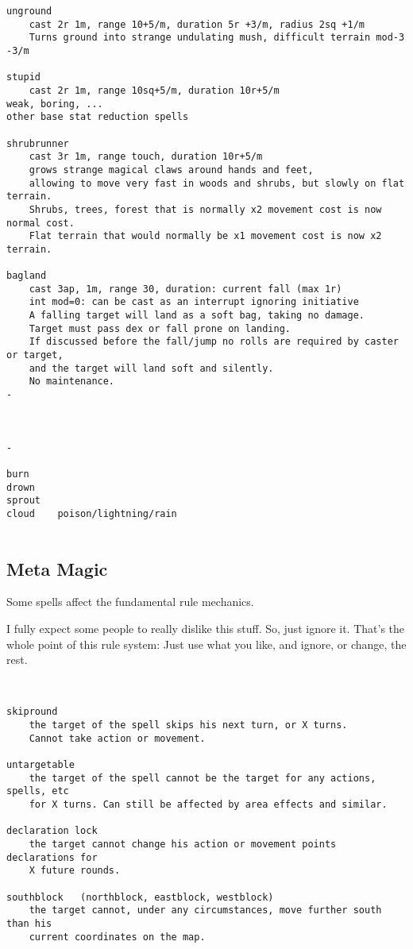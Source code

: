 \begin{verbatim}
unground
    cast 2r 1m, range 10+5/m, duration 5r +3/m, radius 2sq +1/m
    Turns ground into strange undulating mush, difficult terrain mod-3 -3/m

stupid
    cast 2r 1m, range 10sq+5/m, duration 10r+5/m
weak, boring, ...
other base stat reduction spells

shrubrunner
    cast 3r 1m, range touch, duration 10r+5/m
    grows strange magical claws around hands and feet, 
    allowing to move very fast in woods and shrubs, but slowly on flat terrain.
    Shrubs, trees, forest that is normally x2 movement cost is now normal cost.
    Flat terrain that would normally be x1 movement cost is now x2 terrain.

bagland
    cast 3ap, 1m, range 30, duration: current fall (max 1r)
    int mod=0: can be cast as an interrupt ignoring initiative
    A falling target will land as a soft bag, taking no damage.
    Target must pass dex or fall prone on landing.
    If discussed before the fall/jump no rolls are required by caster or target,
    and the target will land soft and silently.
    No maintenance.
-



-

burn
drown
sprout
cloud    poison/lightning/rain


\end{verbatim} \normalsize


\subsection*{Meta Magic}
Some spells affect the fundamental rule mechanics.

I fully expect some people to really dislike this stuff. So, just ignore it. That's the whole point of this rule system: Just use what you like, and ignore, or change, the rest.

\

\small \begin{verbatim}
skipround
    the target of the spell skips his next turn, or X turns. 
    Cannot take action or movement.

untargetable
    the target of the spell cannot be the target for any actions, spells, etc
    for X turns. Can still be affected by area effects and similar.

declaration lock
    the target cannot change his action or movement points declarations for
    X future rounds.

southblock   (northblock, eastblock, westblock)
    the target cannot, under any circumstances, move further south than his 
    current coordinates on the map.
\end{verbatim} \normalsize


